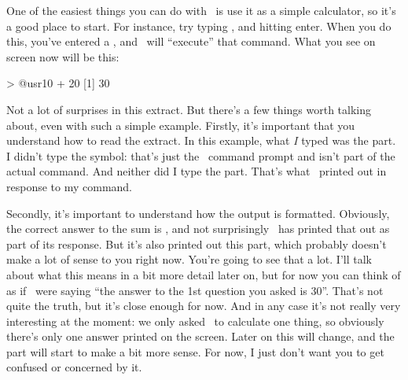One of the easiest things you can do with \R\ is use it as a simple calculator, so it's a good place to start. For instance, try typing , and hitting enter. When you do this, you've entered a , and \R\ will ``execute'' that command. What you see on screen now will be this:
\begin{rblock1}
> @usr{10 + 20}
[1] 30
\end{rblock1}
Not a lot of surprises in this extract. But there's a few things worth talking about, even with such a simple example. Firstly, it's important that you understand how to read the extract. In this example, what {\it I} typed was the  part. I didn't type the \rtextoutput{>} symbol: that's just the \R\ command prompt and isn't part of the actual command. And neither did I type the  part. That's what \R\ printed out in response to my command. 

Secondly, it's important to understand how the output is formatted. Obviously, the correct answer to the sum  is , and not surprisingly \R\ has printed that out as part of its response. But it's also printed out this \rtextoutput{[1]} part, which probably doesn't make a lot of sense to you right now. You're going to see that a lot. I'll talk about what this means in a bit more detail later on, but for now you can think of  as if \R\ were saying ``the answer to the 1st question you asked is 30''. That's not quite the truth, but it's close enough for now. And in any case it's not really very interesting at the moment: we only asked \R\ to calculate one thing, so obviously there's only one answer printed on the screen. Later on this will change, and the \rtextoutput{[1]} part will start to make a bit more sense. For now, I just don't want you to get confused or concerned by it. 


